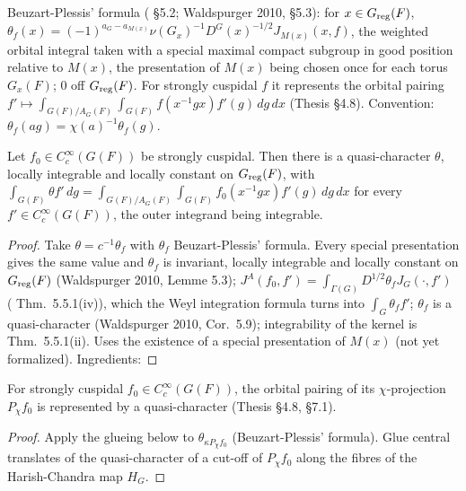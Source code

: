\begin{definition}
\label{thetaF}
\leanok
{}
Beuzart-Plessis' formula (\cite{BP} \S5.2; Waldspurger 2010, \S5.3): for $x\in G_{\mathrm{reg}}(F)$,
$\theta_f(x)=(-1)^{a_G-a_{M(x)}}\nu(G_x)^{-1}D^G(x)^{-1/2}J_{M(x)}(x,f)$, the weighted orbital integral
taken with a special maximal compact subgroup in good position relative to $M(x)$, the presentation
of $M(x)$ being chosen once for each torus $G_x(F)$; $0$ off $G_{\mathrm{reg}}(F)$. For strongly cuspidal $f$
it represents the orbital pairing $f'\mapsto\int_{G(F)/A_G(F)}\int_{G(F)}f(x^{-1}gx)f'(g)\,dg\,dx$
(Thesis \S4.8). Convention: $\theta_f(ag)=\chi(a)^{-1}\theta_f(g)$.
\end{definition}

\begin{theorem}
\label{bp_thetaF_exists}
\leanok
{}
Let $f_0\in C_c^\infty(G(F))$ be strongly cuspidal. Then there is a quasi-character $\theta$, locally integrable
and locally constant on $G_{\mathrm{reg}}(F)$, with $\int_{G(F)}\theta f'\,dg=\int_{G(F)/A_G(F)}\int_{G(F)}f_0(x^{-1}gx)f'(g)\,dg\,dx$
for every $f'\in C_c^\infty(G(F))$, the outer integrand being integrable.
\end{theorem}
\begin{proof}
\leanok
{}
Take $\theta=c^{-1}\theta_f$ with $\theta_f$ Beuzart-Plessis' formula. Every special presentation gives the same
value and $\theta_f$ is invariant, locally integrable and locally constant on $G_{\mathrm{reg}}(F)$ (Waldspurger 2010, Lemme 5.3);
$J^A(f_0,f')=\int_{\Gamma(G)}D^{1/2}\theta_fJ_G(\cdot,f')$ (\cite{BP} Thm.~5.5.1(iv)), which the Weyl integration formula
turns into $\int_G\theta_ff'$; $\theta_f$ is a quasi-character (Waldspurger 2010, Cor.~5.9); integrability of the kernel is
\cite{BP} Thm.~5.5.1(ii). Uses the existence of a special presentation of $M(x)$ (not yet formalized). Ingredients: 
\end{proof}

\begin{lemma}
\label{isThetaF_chiProj}
\leanok
{}
For strongly cuspidal $f_0\in C_c^\infty(G(F))$, the orbital pairing of its $\chi$-projection $P_\chi f_0$
is represented by a quasi-character (Thesis \S4.8, \S7.1).
\end{lemma}
\begin{proof}
\leanok
{}
Apply the glueing below to $\theta_{\kappa P_\chi f_0}$ (Beuzart-Plessis' formula). Glue central translates of the quasi-character of a cut-off of $P_\chi f_0$ along the fibres of the Harish-Chandra map $H_G$.
\end{proof}

